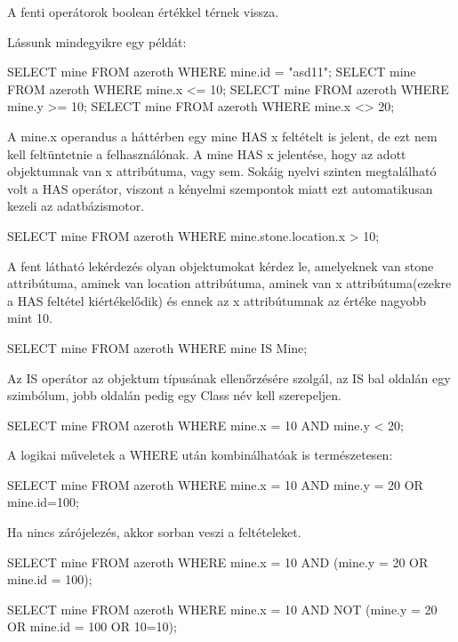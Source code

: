A fenti operátorok boolean értékkel térnek vissza.

Lássunk mindegyikre egy példát:
\begin{sql}
SELECT mine FROM azeroth WHERE mine.id = "asd11";
SELECT mine FROM azeroth WHERE mine.x <= 10;
SELECT mine FROM azeroth WHERE mine.y >= 10;
SELECT mine FROM azeroth WHERE mine.x <> 20;
\end{sql}


A mine.x operandus a háttérben egy mine HAS x feltételt is jelent, de ezt nem kell feltüntetnie a felhasználónak. A mine HAS x jelentése, hogy az adott objektumnak van x attribútuma, vagy sem. Sokáig nyelvi szinten megtalálható volt a HAS operátor, viszont a kényelmi szempontok miatt ezt automatikusan kezeli az adatbázismotor.
 
\begin{sql}
SELECT mine FROM azeroth WHERE mine.stone.location.x > 10;
\end{sql}

A fent látható lekérdezés olyan objektumokat kérdez le, amelyeknek van stone attribútuma, aminek van location attribútuma, aminek van x attribútuma(ezekre a HAS feltétel kiértékelődik) és ennek az x attribútumnak az értéke nagyobb mint 10.

\begin{sql}
SELECT mine FROM azeroth WHERE mine IS Mine;
\end{sql}

Az IS operátor az objektum típusának ellenőrzésére szolgál, az IS bal oldalán egy szimbólum, jobb oldalán pedig egy Class név kell szerepeljen.

\begin{sql}
SELECT mine FROM azeroth WHERE mine.x = 10 AND mine.y < 20;
\end{sql}

A logikai műveletek a WHERE után kombinálhatóak is természetesen:

\begin{sql}
SELECT mine FROM azeroth WHERE mine.x = 10 AND mine.y = 20 OR mine.id=100;
\end{sql}

Ha nincs zárójelezés, akkor sorban veszi a feltételeket.

\begin{sql}
SELECT mine FROM azeroth WHERE mine.x = 10 AND (mine.y = 20 OR mine.id = 100);
\end{sql}

\begin{sql}
SELECT mine FROM azeroth WHERE mine.x = 10 AND NOT (mine.y = 20 OR mine.id = 100 OR 10=10);
\end{sql}

